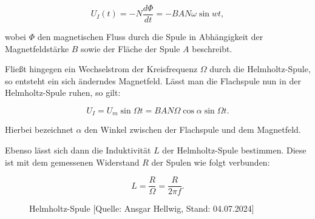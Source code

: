 \documentclass{article}
\begin{document}
\begin{equation}
    U_I (t) = - N \frac{d \Phi}{dt} = - B A N \omega \sin{wt},
    \label{eq:Induktionsgesetz_Helmholtz}
\end{equation}

wobei $\Phi$ den magnetischen Fluss durch die Spule in Abhängigkeit der Magnetfeldstärke $B$ sowie der Fläche der Spule $A$ beschreibt. 

Fließt hingegen ein Wechselstrom der Kreisfrequenz $\Omega$ durch die Helmholtz-Spule, so entsteht ein sich änderndes Magnetfeld. Lässt man die Flachspule nun in der Helmholtz-Spule ruhen, so gilt:

\begin{equation}
    U_I = U_m \sin{\Omega t} = BAN \Omega \cos{\alpha} \sin{\Omega t}.
    \label{eq:Induktionsgesetz_Helmholtz_AC}
\end{equation}

Hierbei bezeichnet $\alpha$ den Winkel zwischen der Flachspule und dem Magnetfeld. 

Ebenso lässt sich dann die Induktivität $L$ der Helmholtz-Spule bestimmen. Diese ist mit dem gemessenen Widerstand $R$ der Spulen wie folgt verbunden:

\begin{equation}
    L = \frac{R}{\Omega} = \frac{R}{2 \pi f}.
    \label{eq:Induktivität}
\end{equation}

\begin{figure}[!b]
    \centering
    \caption[Helmholtz-Spule]{Helmholtz-Spule [Quelle: Ansgar Hellwig\protect\footnotemark, Stand: 04.07.2024]}
    \label{fig:Helmholtz-Spule}
\end{figure}
\end{document}
